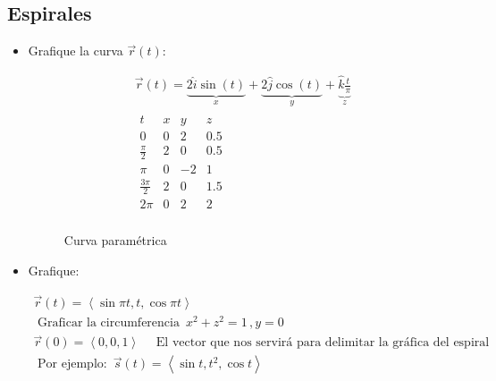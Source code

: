 \subsection{Espirales}
\begin{itemize}
    \item Grafique la curva $\vec{r}(t)$:
        \begin{center}
            \begin{align*}
                \vec{r}(t) = \underbrace{2 \hat{i} \sin (t)}_{x} + \underbrace{2 \hat{j} \cos (t) 
                }_{y} + \underbrace{\hat{k} \frac{t}{\pi}}_{z} \\ 
                \begin{matrix}
                    t & x & y & z \\ 
                    0 & 0 & 2 & 0.5 \\ 
                    \frac{\pi}{2} & 2&  0&  0.5 \\ 
                    \pi & 0 & -2&  1 \\ 
                    \frac{3\pi}{2} & 2 &  0 & 1.5 \\   
                    2\pi &  0 & 2 & 2 \\ 
                \end{matrix} 
            \end{align*}
            \begin{figure}[htbp]
                \centering
                \caption{Curva paramétrica}
                \label{}
            \end{figure}
        \end{center}
    
    \item Grafique:
        \begin{center}
            \begin{align*}
                \vec{r}(t) = \left\langle \sin \pi t , t ,\cos \pi t \right\rangle \\ 
                \text{  Graficar la circumferencia  } \, x^2+z^2= 1\, , y = 0 \\ 
                \vec{r}(0) = \left\langle 0,0,1 \right\rangle \quad \text{  El vector que nos servirá para delimitar la gráfica del espiral  } \\
                \text{  Por ejemplo:   } \, \vec{s}(t) = \left\langle \sin t, t^2 , \cos t \right\rangle \\    
            \end{align*}
        \end{center}
\end{itemize}


















